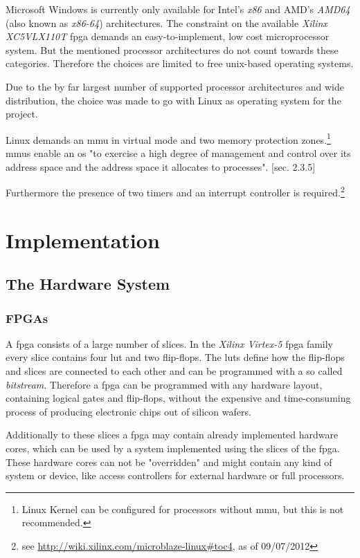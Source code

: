 Microsoft Windows is currently only available for Intel's \textit{x86} and AMD's \textit{AMD64} (also known as \textit{x86-64}) architectures. The constraint on the available \textit{Xilinx XC5VLX110T} \gls{fpga} demands an easy-to-implement, low cost microprocessor system. But the mentioned processor architectures do not count towards these categories. Therefore the choices are limited to free unix-based operating systems.

Due to the by far largest number of supported processor architectures and wide distribution, the choice was made to go with Linux as operating system for the project.

Linux demands an \gls{mmu} in virtual mode and two memory protection zones.\footnote{Linux Kernel can be configured for processors without \gls{mmu}, but this is not recommended.} \gls{mmu}s enable an \gls{os} "to exercise a high degree of
management and control over its address space and the address space it allocates to processes". \cite{linuxPrimer}[sec. 2.3.5]

Furthermore the presence of two timers and an interrupt controller is required.\footnote{see \url{http://wiki.xilinx.com/microblaze-linux\#toc4}, as of 09/07/2012}


\chapter{Implementation}

\section{The Hardware System}

\subsection{FPGAs}

A \gls{fpga} consists of a large number of slices. In the \textit{Xilinx Virtex-5} \gls{fpga} family every slice contains four \gls{lut} and two flip-flops. The \gls{lut}s define how the flip-flops and slices are connected to each other and can be programmed with a so called \textit{bitstream}. Therefore a \gls{fpga} can be programmed with any hardware layout, containing logical gates and flip-flops, without the expensive and time-consuming process of producing electronic chips out of silicon wafers.

Additionally to these slices a \gls{fpga} may contain already implemented hardware cores, which can be used by a system implemented using the slices of the \gls{fpga}. These hardware cores can not be "overridden" and might contain any kind of system or device, like access controllers for external hardware or full processors.


